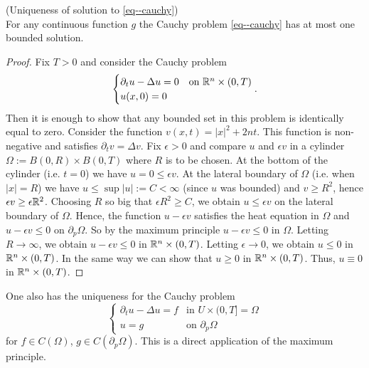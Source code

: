 \documentclass[11pt]{article}
\begin{document}
			\begin{thm}
				(Uniqueness of solution to \eqref{eq--cauchy})\\
				For any continuous function $g$ the Cauchy problem \eqref{eq--cauchy} has at most one bounded solution. 
			\end{thm}
			\begin{proof}
				Fix $T>0$ and consider the Cauchy problem
				\begin{equation*}
					\begin{cases}
						\partial_tu-\Delta u=0 & \text{on }\mathbb{R}^n\times(0,T)\\
						u(x,0)=0 &
					\end{cases}.
				\end{equation*}
				Then it is enough to show that any bounded set in this problem is identically equal to zero. Consider the function $v(x,t)=|x|^2+2nt$. This function is non-negative and satisfies $\partial_tv=\Delta v$. Fix $\epsilon>0$ and compare $u$ and $\epsilon v$ in a cylinder $\Omega:= B(0,R)\times B(0,T)$ where $R$ is to be chosen. At the bottom of the cylinder (i.e. $t=0$) we have $u=0
				\le\epsilon v$. At the lateral boundary of $\Omega$ (i.e. when $|x|=R$) we have $u\le\sup|u|:= C<\infty$ (since $u$ was bounded) and $v\ge R^2$, hence $\epsilon v\ge\epsilon\mathbb{R}^2$. Choosing $R$ so big that $\epsilon R^2\ge C$, we obtain $u\le\epsilon v$ on the lateral boundary of $\Omega$. Hence, the function $u-\epsilon v$ satisfies the heat equation in $\Omega$ and $u-\epsilon v\le0$ on $\partial_p\Omega$. So by the maximum principle $u-\epsilon v\le0$ in $\Omega$. Letting $R\to\infty$, we obtain $u-\epsilon v\le0$ in $\mathbb{R}^n\times(0,T)$. Letting $\epsilon\to0$, we obtain $u\le0$ in $\mathbb{R}^n\times(0,T)$. In the same way we can show that $u\ge0$ in $\mathbb{R}^n\times(0,T)$. Thus, $u\equiv0$ in $\mathbb{R}^n\times(0,T)$.
			\end{proof}

			\begin{remark}
				One also has the uniqueness for the Cauchy problem
				\begin{equation*}
					\begin{cases}
						\partial_tu-\Delta u=f & \text{in }U\times(0,T]=\Omega\\
						u=g & \text{on }\partial_p\Omega
					\end{cases}
				\end{equation*}
				for $f\in C(\Omega)$, $g\in C(\partial_p\Omega)$. This is a direct application of the maximum principle.
			\end{remark}
\end{document}
